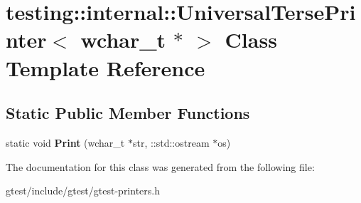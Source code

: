 \hypertarget{classtesting_1_1internal_1_1UniversalTersePrinter_3_01wchar__t_01_5_01_4}{}\section{testing\+:\+:internal\+:\+:Universal\+Terse\+Printer$<$ wchar\+\_\+t $\ast$ $>$ Class Template Reference}
\label{classtesting_1_1internal_1_1UniversalTersePrinter_3_01wchar__t_01_5_01_4}
\subsection*{Static Public Member Functions}
\begin{DoxyCompactItemize}
\item 
\mbox{\label{classtesting_1_1internal_1_1UniversalTersePrinter_3_01wchar__t_01_5_01_4_a9cdf673b44d19e6879253f30f11cd740}} 
static void {\bfseries Print} (wchar\+\_\+t $\ast$str, \+::std\+::ostream $\ast$os)
\end{DoxyCompactItemize}


The documentation for this class was generated from the following file\+:\begin{DoxyCompactItemize}
\item 
gtest/include/gtest/gtest-\/printers.\+h\end{DoxyCompactItemize}
